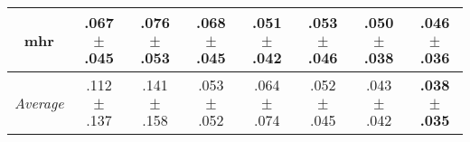 \begin{tabular}{|c|ccccccc|}
mhr & .067$^{\phantom{\dag}}\pm^{\phantom{\dag}}$.045\cellcolor{red!14} & .076$^{\phantom{\dag}}\pm^{\phantom{\dag}}$.053\cellcolor{red!40} & .068$^{\phantom{\dag}}\pm^{\phantom{\dag}}$.045\cellcolor{red!19} & .051$^{\phantom{\dag}}\pm^{\phantom{\dag}}$.042\cellcolor{green!25} & .053$^{\phantom{\dag}}\pm^{\phantom{\dag}}$.046\cellcolor{green!21} & .050$^{\phantom{\dag}}\pm^{\phantom{\dag}}$.038\cellcolor{green!30} & \textbf{.046$^{\phantom{\dag}}\pm^{\phantom{\dag}}$.036}\cellcolor{green!40} \\\hline
\textit{Average} & .112$^{\phantom{\dag}}\pm^{\phantom{\dag}}$.137\cellcolor{red!17} & .141$^{\phantom{\dag}}\pm^{\phantom{\dag}}$.158\cellcolor{red!40} & .053$^{\phantom{\dag}}\pm^{\phantom{\dag}}$.052\cellcolor{green!28} & .064$^{\phantom{\dag}}\pm^{\phantom{\dag}}$.074\cellcolor{green!19} & .052$^{\phantom{\dag}}\pm^{\phantom{\dag}}$.045\cellcolor{green!29} & .043$^{\phantom{\dag}}\pm^{\phantom{\dag}}$.042\cellcolor{green!36} & \textbf{.038$^{\phantom{\dag}}\pm^{\phantom{\dag}}$.035}\cellcolor{green!40} \\\hline
\end{tabular}